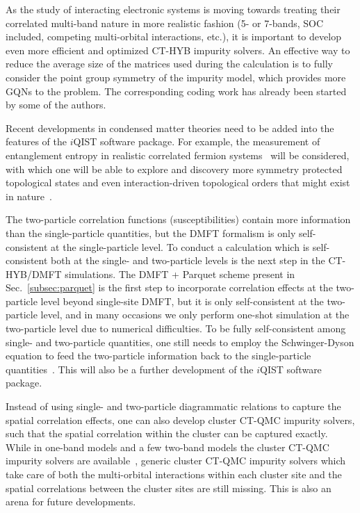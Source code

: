 As the study of interacting electronic systems is moving towards treating their correlated multi-band nature in more realistic fashion (5- or 7-bands, SOC included, competing multi-orbital interactions, etc.), it is important to develop even more efficient and optimized CT-HYB impurity solvers. An effective way to reduce the average size of the matrices used during the calculation is to fully consider the point group symmetry of the impurity model, which provides more GQNs to the problem. The corresponding coding work has already been started by some of the authors.

Recent developments in condensed matter theories need to be added into the features of the $i$QIST software package. For example, the measurement of entanglement entropy in realistic correlated fermion systems~\cite{PhysRevLett.111.130402,PhysRevB.89.125121} will be considered, with which one will be able to explore and discovery more symmetry protected topological states and even interaction-driven topological orders that might exist in nature~\cite{Chen21122012,Wang07022014}. 

The two-particle correlation functions (susceptibilities) contain more information than the single-particle quantities, but the DMFT formalism is only self-consistent at the single-particle level. To conduct a calculation which is self-consistent both at the single- and two-particle levels is the next step in the CT-HYB/DMFT simulations. The DMFT + Parquet scheme present in Sec.~\ref{subsec:parquet} is the first step to incorporate correlation effects at the two-particle level beyond single-site DMFT, but it is only self-consistent at the two-particle level, and in many occasions we only perform one-shot simulation at the two-particle level due to numerical difficulties. To be fully self-consistent among single- and two-particle quantities, one still needs to employ the Schwinger-Dyson equation to feed the two-particle information back to the single-particle quantities~\cite{PhysRevE.80.046706,PhysRevE.87.013311}. This will also be a further development of the $i$QIST software package.

Instead of using single- and two-particle diagrammatic relations to capture the spatial correlation effects, one can also develop cluster CT-QMC impurity solvers, such that the spatial correlation within the cluster can be captured exactly. While in one-band models and a few two-band models the cluster CT-QMC impurity solvers are available~\cite{RevModPhys.77.1027,RevModPhys.78.865,PhysRevB.88.041103,PhysRevB.88.245110,PhysRevB.89.195146}, generic cluster CT-QMC impurity solvers which take care of both the multi-orbital interactions within each cluster site and the spatial correlations between the cluster sites are still missing. This is also an arena for future developments.

